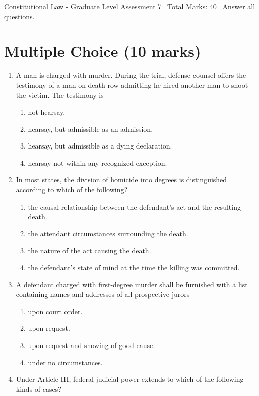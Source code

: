 \documentclass[12pt]{article}
\begin{document}
\begin{center}
Constitutional Law - Graduate Level Assessment 7 \
Total Marks: 40 \
Answer all questions.
\end{center}

\section*{Multiple Choice (10 marks)}
\begin{enumerate}[label=\arabic*.]
\item A man is charged with murder. During the trial, defense counsel offers the testimony of a man on death row admitting he hired another man to shoot the victim. The testimony is
\begin{enumerate}[label=(\alph*)]
    \item not hearsay.
    \item hearsay, but admissible as an admission.
    \item hearsay, but admissible as a dying declaration.
    \item hearsay not within any recognized exception.
\end{enumerate}
\item In most states, the division of homicide into degrees is distinguished according to which of the following?
\begin{enumerate}[label=(\alph*)]
    \item the causal relationship between the defendant's act and the resulting death.
    \item the attendant circumstances surrounding the death.
    \item the nature of the act causing the death.
    \item the defendant's state of mind at the time the killing was committed.
\end{enumerate}
\item A defendant charged with first-degree murder shall be furnished with a list containing names and addresses of all prospective jurors
\begin{enumerate}[label=(\alph*)]
    \item upon court order.
    \item upon request.
    \item upon request and showing of good cause.
    \item under no circumstances.
\end{enumerate}
\item Under Article III, federal judicial power extends to which of the following kinds of cases?

\end{enumerate}
\end{document}
